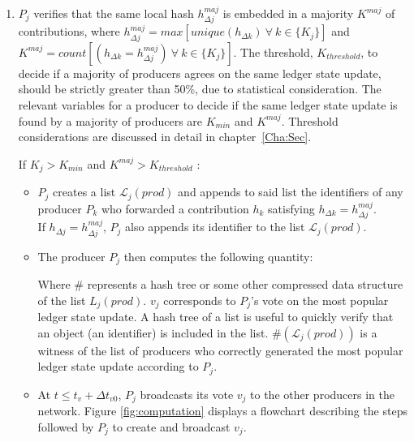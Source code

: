 \begin{enumerate}
\item $P_j$ verifies that the same local hash $h^{maj}_{\Delta j}$ is embedded in a majority $K^{maj}$ of contributions, where $h^{maj}_{\Delta j}= max[unique(h_{\Delta k})~\forall~k\in\{K_j\}]$ and $K^{maj} = count[(h_{\Delta k} = h^{maj}_{\Delta j})~\forall~k\in\{K_j\}]$. The threshold, $K_{threshold}$, to decide if a majority of producers agrees on the same ledger state update, should be strictly greater than 50\%, due to statistical consideration. The relevant variables for a producer to decide if the same ledger state update is found by a majority of producers are $K_{min}$ and $K^{maj}$. Threshold considerations are discussed in detail in chapter~\ref{Cha:Sec}. 

If $K_j > K_{min}$ and  $K^{maj}  > K_{threshold}$ :

\begin{itemize}
\item $P_j$ creates a list $\mathcal{L}_j(prod)$ and appends to said list the identifiers of any producer $P_k$ who forwarded a contribution $h_k$ satisfying $h_{\Delta k} = h^{maj}_{\Delta j}$.\\
If $h_{\Delta j}= h^{maj}_{\Delta j}$, $P_j$ also appends its identifier to the list $\mathcal{L}_j(prod)$.
\item The producer $P_j$ then computes the following quantity: 

\begin{center}
\end{center}

Where \# represents a hash tree or some other compressed data structure of the list $L_j(prod)$. $v_j$ corresponds to $P_j$'s vote on the most popular ledger state update. A hash tree of a list is useful to quickly verify that an object (an identifier) is included in the list. $\#(\mathcal{L}_j(prod))$ is a witness of the list of producers who correctly generated the most popular ledger state update according to $P_j$. 
\item At $t \leq t_v+\Delta t_{v0}$, $P_j$ broadcasts its vote $v_j$ to the other producers in the network. Figure \ref{fig:computation} displays a flowchart describing the steps followed by $P_j$ to create and broadcast $v_j$.  
\end{itemize}


\end{enumerate}
